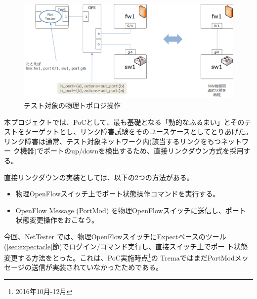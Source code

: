 \begin{figure}[h]
 \centering
 \includegraphics[scale=0.6]{img/patch-layer1.png}
 \caption{テスト対象の物理トポロジ操作}
 \label{fig:patch-layer1}
\end{figure}

本プロジェクトでは、PoCとして、最も基礎となる「動的なふるまい」とそのテ
ストをターゲットとし、リンク障害試験をそのユースケースとしてとりあげた。
リンク障害は通常、テスト対象ネットワーク内(該当するリンクをもつネットワー
ク機器)でポートのup/downを検出するため、直接リンクダウン方式を採用する。

直接リンクダウンの実装としては、以下の2つの方法がある。
\begin{itemize}
 \item 物理OpenFlowスイッチ上でポート状態操作コマンドを実行する。
 \item OpenFlow Message (PortMod) を物理OpenFlowスイッチに送信し、ポート
       状態変更操作をおこなう。
\end{itemize}
今回、NetTester では、物理OpenFlowスイッチにExpectベースのツール
(\ref{sec:expectacle}節)でログイン/コマンド実行し、直接スイッチ上でポー
ト状態変更する方法をとった。これは、PoC実施時点\footnote{2016年10月-12月}の
TremaではまだPortModメッセージの送信が実装されていなかったためである。





